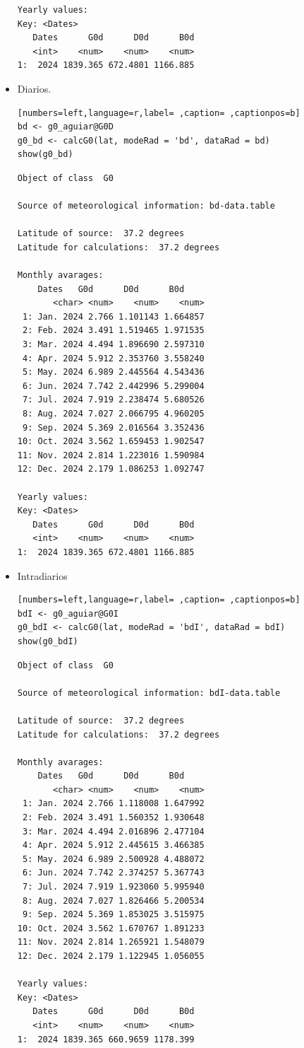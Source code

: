 \begin{itemize}
\begin{verbatim}
Yearly values:
Key: <Dates>
   Dates      G0d      D0d      B0d
   <int>    <num>    <num>    <num>
1:  2024 1839.365 672.4801 1166.885
\end{verbatim}

\item Diarios.
\begin{lstlisting}[numbers=left,language=r,label= ,caption= ,captionpos=b]
bd <- g0_aguiar@G0D
g0_bd <- calcG0(lat, modeRad = 'bd', dataRad = bd)
show(g0_bd)
\end{lstlisting}

\begin{verbatim}
Object of class  G0 

Source of meteorological information: bd-data.table 

Latitude of source:  37.2 degrees
Latitude for calculations:  37.2 degrees

Monthly avarages:
	Dates   G0d      D0d      B0d
       <char> <num>    <num>    <num>
 1: Jan. 2024 2.766 1.101143 1.664857
 2: Feb. 2024 3.491 1.519465 1.971535
 3: Mar. 2024 4.494 1.896690 2.597310
 4: Apr. 2024 5.912 2.353760 3.558240
 5: May. 2024 6.989 2.445564 4.543436
 6: Jun. 2024 7.742 2.442996 5.299004
 7: Jul. 2024 7.919 2.238474 5.680526
 8: Aug. 2024 7.027 2.066795 4.960205
 9: Sep. 2024 5.369 2.016564 3.352436
10: Oct. 2024 3.562 1.659453 1.902547
11: Nov. 2024 2.814 1.223016 1.590984
12: Dec. 2024 2.179 1.086253 1.092747

Yearly values:
Key: <Dates>
   Dates      G0d      D0d      B0d
   <int>    <num>    <num>    <num>
1:  2024 1839.365 672.4801 1166.885
\end{verbatim}

\item Intradiarios
\begin{lstlisting}[numbers=left,language=r,label= ,caption= ,captionpos=b]
bdI <- g0_aguiar@G0I
g0_bdI <- calcG0(lat, modeRad = 'bdI', dataRad = bdI)
show(g0_bdI)
\end{lstlisting}

\begin{verbatim}
Object of class  G0 

Source of meteorological information: bdI-data.table 

Latitude of source:  37.2 degrees
Latitude for calculations:  37.2 degrees

Monthly avarages:
	Dates   G0d      D0d      B0d
       <char> <num>    <num>    <num>
 1: Jan. 2024 2.766 1.118008 1.647992
 2: Feb. 2024 3.491 1.560352 1.930648
 3: Mar. 2024 4.494 2.016896 2.477104
 4: Apr. 2024 5.912 2.445615 3.466385
 5: May. 2024 6.989 2.500928 4.488072
 6: Jun. 2024 7.742 2.374257 5.367743
 7: Jul. 2024 7.919 1.923060 5.995940
 8: Aug. 2024 7.027 1.826466 5.200534
 9: Sep. 2024 5.369 1.853025 3.515975
10: Oct. 2024 3.562 1.670767 1.891233
11: Nov. 2024 2.814 1.265921 1.548079
12: Dec. 2024 2.179 1.122945 1.056055

Yearly values:
Key: <Dates>
   Dates      G0d      D0d      B0d
   <int>    <num>    <num>    <num>
1:  2024 1839.365 660.9659 1178.399
\end{verbatim}
\end{itemize}


